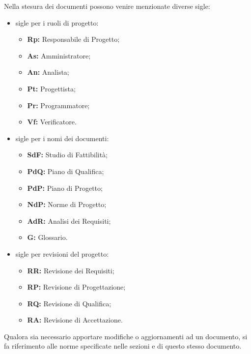         Nella stesura dei documenti possono venire menzionate diverse sigle:
        \begin{itemize}
          \item sigle per i ruoli di progetto:
            \begin{itemize}
              \item \textbf{Rp:} Responsabile di Progetto;
              \item \textbf{As:} Amministratore;
              \item \textbf{An:} Analista;
              \item \textbf{Pt:} Progettista;
              \item \textbf{Pr:} Programmatore;
              \item \textbf{Vf:} Verificatore.
            \end{itemize}
          \item sigle per i nomi dei documenti:
            \begin{itemize}
              \item \textbf{SdF:} Studio di Fattibilità;
              \item \textbf{PdQ:} Piano di Qualifica;
              \item \textbf{PdP:} Piano di Progetto;
              \item \textbf{NdP:} Norme di Progetto;
              \item \textbf{AdR:} Analisi dei Requisiti;
              \item \textbf{G:} Glossario.
            \end{itemize}
          \item sigle per revisioni del progetto:
            \begin{itemize}
              \item \textbf{RR:} Revisione dei Requisiti;
              \item \textbf{RP:} Revisione di Progettazione;
              \item \textbf{RQ:} Revisione di Qualifica;
              \item \textbf{RA:} Revisione di Accettazione.
            \end{itemize}
        \end{itemize}
		Qualora sia necessario apportare modifiche o aggiornamenti ad un documento, si fa riferimento alle norme specificate nelle sezioni  e  di questo stesso documento.
